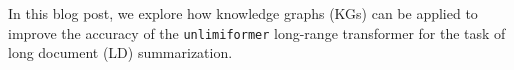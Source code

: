 In this blog post, we explore how knowledge graphs (KGs) can be applied to improve the accuracy of the \texttt{unlimiformer} long-range transformer for the task of long document (LD) summarization.